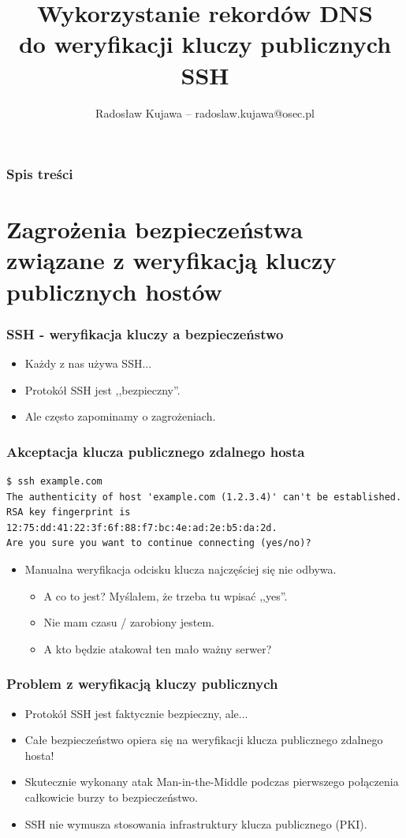 \documentclass[dvipsnames,table]{beamer}
\title{Wykorzystanie rekordów DNS \\ do weryfikacji kluczy publicznych SSH}
\author{Radosław Kujawa -- radoslaw.kujawa@osec.pl}
\institute{OSEC}
\begin{document}
\begin{frame}
\titlepage
\end{frame}

\begin{frame}[allowframebreaks]
\frametitle{Spis treści}
{
\hypersetup{colorlinks=true,linkcolor=black,urlcolor=OSEC-red}
\tableofcontents
}
\end{frame}

\section{Zagrożenia bezpieczeństwa związane z weryfikacją kluczy publicznych hostów}

\begin{frame}
\frametitle{SSH - weryfikacja kluczy a bezpieczeństwo}
\begin{itemize}
	\item Każdy z nas używa SSH...
	\item Protokół SSH jest ,,bezpieczny''.
	\item Ale często zapominamy o zagrożeniach.
\end{itemize}
\end{frame}

\begin{frame}[fragile]
\frametitle{Akceptacja klucza publicznego zdalnego hosta}
\scriptsize
\begin{verbatim}
$ ssh example.com
The authenticity of host 'example.com (1.2.3.4)' can't be established.
RSA key fingerprint is 12:75:dd:41:22:3f:6f:88:f7:bc:4e:ad:2e:b5:da:2d.
Are you sure you want to continue connecting (yes/no)?
\end{verbatim}
\normalsize
\begin{itemize}
	\item Manualna weryfikacja odcisku klucza najczęściej się nie odbywa.
	\begin{itemize}
		\item A co to jest? Myślałem, że trzeba tu wpisać ,,yes''.
		\item Nie mam czasu / zarobiony jestem.
		\item A kto będzie atakował ten mało ważny serwer?
	\end{itemize}

\end{itemize}

\end{frame}

\begin{frame}
\frametitle{Problem z weryfikacją kluczy publicznych}
\begin{itemize}
	\item Protokół SSH jest faktycznie bezpieczny, ale...
	\item Całe bezpieczeństwo opiera się na weryfikacji klucza publicznego zdalnego hosta!
	\item Skutecznie wykonany atak Man-in-the-Middle podczas pierwszego połączenia całkowicie burzy to bezpieczeństwo.
	\item SSH nie wymusza stosowania infrastruktury klucza publicznego (PKI).
\end{itemize}
\end{frame}
\end{document}
